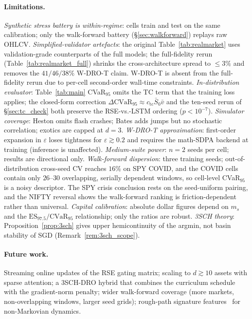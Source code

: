 \documentclass[10pt,letterpaper]{article}
\newcommand{\cvar}{\mathrm{CVaR}}
\newcommand{\ES}{\mathrm{ES}}
\begin{document}
\paragraph{Limitations.}\label{sec:limitations}
\textit{Synthetic stress battery is within-regime}: cells train
and test on the same calibration; only the walk-forward battery
(\S\ref{sec:walkforward}) replays raw OHLCV.
\textit{Simplified-validator artefacts}: the original
Table~\ref{tab:realmarket} uses validation-grade counterparts of
the full models; the full-fidelity rerun
(Table~\ref{tab:realmarket_full}) shrinks the cross-architecture
spread to $\le 3\%$ and removes the $41/46/38\%$ W-DRO-T claim.
W-DRO-T is absent from the full-fidelity rerun due to per-cell
second-order wall-time constraints.
\textit{In-distribution evaluator}: Table~\ref{tab:main}
CVaR$_{95}$ omits the TC term that the training loss applies;
the closed-form correction
$\Delta\cvar_{95}\!\approx\!c_{\mathrm{tc}}\bar S_0\bar v$ and the
ten-seed rerun of \S\ref{sec:tc_check} both preserve the RSE-vs.-LSTM
ordering ($p<10^{-7}$).
\textit{Simulator coverage}: Heston omits flash crashes; Bates
adds jumps but no stochastic correlation; exotics are capped at
$d=3$.
\textit{W-DRO-T approximation}: first-order expansion in
$\varepsilon$ loses tightness for $\varepsilon\gtrsim 0.2$ and
requires the math-SDPA backend at training (inference is
unaffected).
\textit{Medium-suite power}: $n=2$ seeds per cell; results are
directional only.
\textit{Walk-forward dispersion}: three training seeds;
out-of-distribution cross-seed CV reaches $16\%$ on SPY COVID, and
the COVID cells contain only $26$--$30$ overlapping, serially
dependent windows, so cell-level CVaR$_{95}$ is a noisy
descriptor. The SPY crisis conclusion rests on the seed-uniform
pairing, and the NIFTY reversal shows the walk-forward ranking is
friction-dependent rather than universal.
\textit{Capital calibration}: absolute dollar figures depend on
$m_s$ and the $\ES_{97.5}/\cvar_{95}$ relationship; only the
ratios are robust.
\textit{3SCH theory}: Proposition~\ref{prop:3sch} gives upper
hemicontinuity of the argmin, not basin stability of SGD
(Remark~\ref{rem:3sch_scope}).

\paragraph{Future work.}
Streaming online updates of the RSE gating matrix; scaling to
$d\gtrsim 10$ assets with sparse attention; a 3SCH-DRO hybrid that
combines the curriculum schedule with the gradient-norm penalty;
wider walk-forward coverage (more markets, non-overlapping
windows, larger seed grids); rough-path signature
features~\citep{lyons1998differential,kidger2020signatory} for
non-Markovian dynamics.
\end{document}
